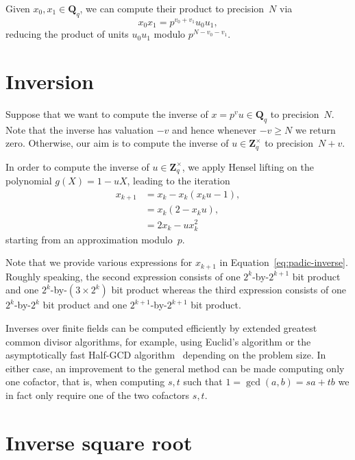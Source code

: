 Given $x_0, x_1 \in \mathbf{Q}_q$, we can compute their product 
to precision~$N$ via 
\begin{equation}
x_0 x_1 = p^{v_0 + v_1} u_0 u_1,
\end{equation}
reducing the product of units $u_0 u_1$ modulo $p^{N - v_0 - v_1}$.

\section{Inversion}

Suppose that we want to compute the inverse of $x = p^v u \in \mathbf{Q}_q$ 
to precision~$N$.  Note that the inverse has valuation $-v$ and hence 
whenever $-v \geq N$ we return zero.  Otherwise, our aim is to compute 
the inverse of $u \in \mathbf{Z}_q^{\times}$ to precision~$N+v$.

In order to compute the inverse of $u \in \mathbf{Z}_q^{\times}$, we 
apply Hensel lifting on the polynomial $g(X) = 1 - u X$, leading to 
the iteration
\begin{equation} \label{eq:padic-inverse}
\begin{split}
x_{k + 1} & = x_k - x_k (x_k u - 1), \\
          & = x_k (2 - x_k u), \\
          & = 2 x_k - u x_k^2
\end{split}
\end{equation}
starting from an approximation modulo~$p$.

Note that we provide various expressions for $x_{k+1}$ in 
Equation~\eqref{eq:padic-inverse}.  Roughly speaking, the 
second expression consists of one $2^k$-by-$2^{k+1}$ bit 
product and one $2^k$-by-$(3 \times 2^k)$ bit product whereas 
the third expression consists of one $2^k$-by-$2^k$ bit product 
and one $2^{k+1}$-by-$2^{k+1}$ bit product.

Inverses over finite fields can be computed efficiently by 
extended greatest common divisor algorithms, for example, using 
Euclid's algorithm or the asymptotically fast Half-GCD 
algorithm~\citep{ThullYap1990} depending on the problem size.  
In either case, an improvement to the general method can be made 
computing only one cofactor, that 
is, when computing $s, t$ such that $1 = \gcd(a,b) = sa + tb$ 
we in fact only require one of the two cofactors $s, t$.

\section{Inverse square root}

